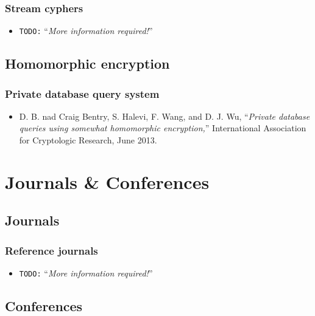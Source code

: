 \documentclass{beamer}
\newcommand{\todo}[1]{\texttt{\color{red}TODO:} ``\emph{#1}''}
\begin{document}
\begin{frame}
\frametitle{Stream cyphers}
    \begin{itemize}
        \item \todo{More information required!}
    \end{itemize}
\end{frame}

\subsection{Homomorphic encryption}

\begin{frame}
\frametitle{Private database query system}
    \begin{itemize}
        \item D. B. nad Craig Bentry, S. Halevi, F. Wang, and D. J. Wu, ``\emph{Private database queries using somewhat homomorphic encryption,}'' International Association for Cryptologic Research, June 2013.
    \end{itemize}
\end{frame}

\section{Journals \& Conferences}

\subsection{Journals}

\begin{frame}
\frametitle{Reference journals}
    \begin{itemize}
        \item \todo{More information required!}
    \end{itemize}
\end{frame}

\subsection{Conferences}
\end{document}
